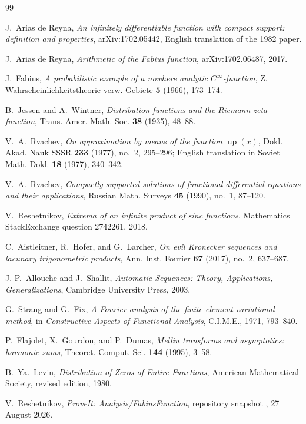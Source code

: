 \documentclass[11pt]{article}
\numberwithin{equation}{section}
\theoremstyle{definition}
\theoremstyle{remark}
\newcommand{\Up}{\operatorname{up}}
\begin{document}
\begin{thebibliography}{99}

J.~Arias de Reyna,
\emph{An infinitely differentiable function with compact support: definition and properties},
arXiv:1702.05442, English translation of the 1982 paper.

J.~Arias de Reyna,
\emph{Arithmetic of the Fabius function},
arXiv:1702.06487, 2017.

J.~Fabius,
\emph{A probabilistic example of a nowhere analytic $C^\infty$-function},
Z. Wahrscheinlichkeitstheorie verw. Gebiete \textbf{5} (1966), 173--174.

B.~Jessen and A.~Wintner,
\emph{Distribution functions and the Riemann zeta function},
Trans. Amer. Math. Soc. \textbf{38} (1935), 48--88.

V.~A.~Rvachev,
\emph{On approximation by means of the function $\Up(x)$},
Dokl. Akad. Nauk SSSR \textbf{233} (1977), no.~2, 295--296;
English translation in Soviet Math. Dokl. \textbf{18} (1977), 340--342.

V.~A.~Rvachev,
\emph{Compactly supported solutions of functional-differential equations and their applications},
Russian Math. Surveys \textbf{45} (1990), no.~1, 87--120.

V.~Reshetnikov,
\emph{Extrema of an infinite product of sinc functions},
Mathematics StackExchange question 2742261, 2018.

C.~Aistleitner, R.~Hofer, and G.~Larcher,
\emph{On evil Kronecker sequences and lacunary trigonometric products},
Ann. Inst. Fourier \textbf{67} (2017), no.~2, 637--687.

J.-P.~Allouche and J.~Shallit,
\emph{Automatic Sequences: Theory, Applications, Generalizations},
Cambridge University Press, 2003.

G.~Strang and G.~Fix,
\emph{A Fourier analysis of the finite element variational method},
in \emph{Constructive Aspects of Functional Analysis}, C.I.M.E., 1971, 793--840.

P.~Flajolet, X.~Gourdon, and P.~Dumas,
\emph{Mellin transforms and asymptotics: harmonic sums},
Theoret. Comput. Sci. \textbf{144} (1995), 3--58.

B.~Ya.~Levin,
\emph{Distribution of Zeros of Entire Functions},
American Mathematical Society, revised edition, 1980.

V.~Reshetnikov,
\emph{ProveIt: Analysis/FabiusFunction}, repository snapshot
\commit, 27 August 2026.

\end{thebibliography}
\end{document}
